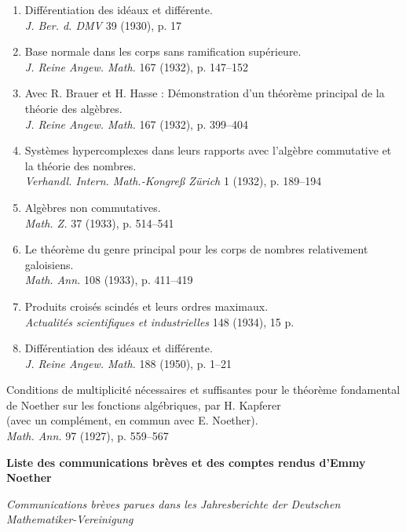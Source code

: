 \begin{enumerate}
\emph{Rec. Soc. Math. Moscou} 36 (1929), p. 65--72
\item Différentiation des idéaux et différente.\\
\emph{J. Ber. d. DMV} 39 (1930), p. 17
\item Base normale dans les corps sans ramification supérieure.\\
\emph{J. Reine Angew. Math.} 167 (1932), p. 147--152
\item Avec R. Brauer et H. Hasse : Démonstration d'un théorème principal de la théorie des algèbres.\\
\emph{J. Reine Angew. Math.} 167 (1932), p. 399--404
\item Systèmes hypercomplexes dans leurs rapports avec l'algèbre commutative et la théorie des nombres.\\
\emph{Verhandl. Intern. Math.-Kongreß Zürich} 1 (1932), p. 189--194
\item Algèbres non commutatives.\\
\emph{Math. Z.} 37 (1933), p. 514--541
\item Le théorème du genre principal pour les corps de nombres relativement galoisiens.\\
\emph{Math. Ann.} 108 (1933), p. 411--419
\item Produits croisés scindés et leurs ordres maximaux.\\
\emph{Actualités scientifiques et industrielles} 148 (1934), 15 p.
\item Différentiation des idéaux et différente.\\
\emph{J. Reine Angew. Math.} 188 (1950), p. 1--21
\end{enumerate}

\noindent Conditions de multiplicité nécessaires et suffisantes pour le théorème fondamental de Noether sur les fonctions algébriques, par H. Kapferer\\
(avec un complément, en commun avec E. Noether).\\
\emph{Math. Ann.} 97 (1927), p. 559--567

\clearpage
\begin{center}
{\Large\bfseries Liste des communications brèves et des comptes rendus d'Emmy Noether}
\end{center}
\label{fr-r823-liste-communications-comptes-rendus}

\begin{center}
\emph{Communications brèves parues dans les Jahresberichte der Deutschen Mathematiker-Vereinigung}
\end{center}


